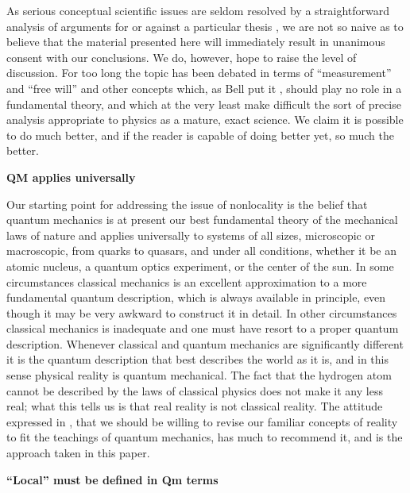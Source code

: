 \documentclass[12pt]{article} %
\def\outl#1{\par{\medskip\noindent\hspace*{.5cm}\bf
      \mathversion{bold}#1\mathversion{normal}\smallskip} }
\def\np{} \def\xa{} \def\xb{} \def\xn{} \def\xp{}
\def\outl#1{} \def\np{} \def\xa{} \def\xb{} \def\xn{} \def\xp{}
\def\outl#1{\par{\medskip\noindent\hspace*{.5cm}\bf
      \mathversion{bold}#1\mathversion{normal}\smallskip} }
\def\np{\newpage }\def\xn{\nopagebreak }\def\xp{\pagebreak }
\begin{document}
As serious conceptual scientific issues are seldom resolved by a
straightforward analysis of arguments for or against a particular thesis
\cite{Khn70}, we are not so naive as to believe that the material presented
here will immediately result in unanimous consent with our conclusions.  We
do, however, hope to raise the level of discussion.  For too long the topic
has been debated in terms of ``measurement'' and ``free will'' and other
concepts which, as Bell put it \cite{Bll90}, should play no role in a
fundamental theory, and which at the very least make difficult the sort of
precise analysis appropriate to physics as a mature, exact science.  We claim
it is possible to do much better, and if the reader is capable of doing better
yet, so much the better.


\xb
\outl{QM applies universally}
\xa



Our starting point for addressing the issue of nonlocality is the belief that
quantum mechanics is at present our best fundamental theory of the mechanical
laws of nature and applies universally to systems of all sizes, microscopic or
macroscopic, from quarks to quasars, and under all conditions, whether it be
an atomic nucleus, a quantum optics experiment, or the center of the sun.  In
some circumstances classical mechanics is an excellent approximation to a more
fundamental quantum description, which is always available in principle, even
though it may be very awkward to construct it in detail.  In other
circumstances classical mechanics is inadequate and one must have resort to a
proper quantum description. Whenever classical and quantum mechanics are
significantly different it is the quantum description that best describes the
world as it is, and in this sense physical reality is quantum mechanical.  The
fact that the hydrogen atom cannot be described by the laws of classical
physics does not make it any less real; what this tells us is that real
reality is not classical reality.  The attitude expressed in \cite{ChCr93},
 that we should be willing to revise our familiar concepts of
reality to fit the teachings of quantum mechanics, has much to recommend it,
and is the approach taken in this paper.


\xb
\outl{``Local'' must be defined in Qm terms}
\xa
\end{document}
